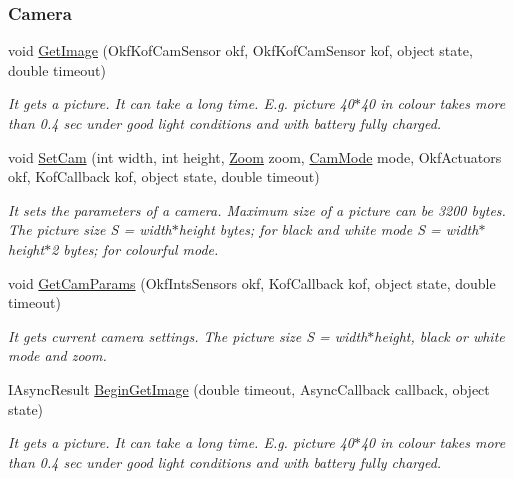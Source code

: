 \subsubsection*{Camera} %
\label{ssub:Camera}
  \begin{DoxyCompactItemize}

  \item  void \hyperlink{class_elib_1_1_epuck_a93ba5219d4d0b3ac382a902b35e7e372}{GetImage} (OkfKofCamSensor okf, OkfKofCamSensor kof, object state, double timeout)
  \begin{DoxyCompactList}\small\item\em It gets a picture. It can take a long time. E.g. picture 40$\ast$40 in colour takes more than 0.4 sec under good light conditions and with battery fully charged. \item\end{DoxyCompactList}

  \item void \hyperlink{class_elib_1_1_epuck_a03911f706081e305b8602f921ad6b34b}{SetCam} (int width, int height, \hyperlink{namespace_elib_af2af0734145f6e03503f2379f6249669}{Zoom} zoom, \hyperlink{namespace_elib_acc08cc9ecc6edea0df55bcb7a1529c17}{CamMode} mode, OkfActuators okf, KofCallback kof, object state, double timeout)
  \begin{DoxyCompactList}\small\item\em It sets the parameters of a camera. Maximum size of a picture can be 3200 bytes. The picture size S = width$\ast$height bytes; for black and white mode S = width$\ast$height$\ast$2 bytes; for colourful mode. \item\end{DoxyCompactList}

  \item  void \hyperlink{class_elib_1_1_epuck_a77057f06395cb1887ca3d504f1c51d2f}{GetCamParams} (OkfIntsSensors okf, KofCallback kof, object state, double timeout)
  \begin{DoxyCompactList}\small\item\em It gets current camera settings. The picture size S = width$\ast$height, black or white mode and zoom. \item\end{DoxyCompactList}
  \item   IAsyncResult \hyperlink{class_elib_1_1_epuck_afe274f8efd46c68587ec706f7dfc8a35}{BeginGetImage} (double timeout, AsyncCallback callback, object state)
  \begin{DoxyCompactList}\small\item\em It gets a picture. It can take a long time. E.g. picture 40$\ast$40 in colour takes more than 0.4 sec under good light conditions and with battery fully charged. \item\end{DoxyCompactList}
  

\end{DoxyCompactItemize}
